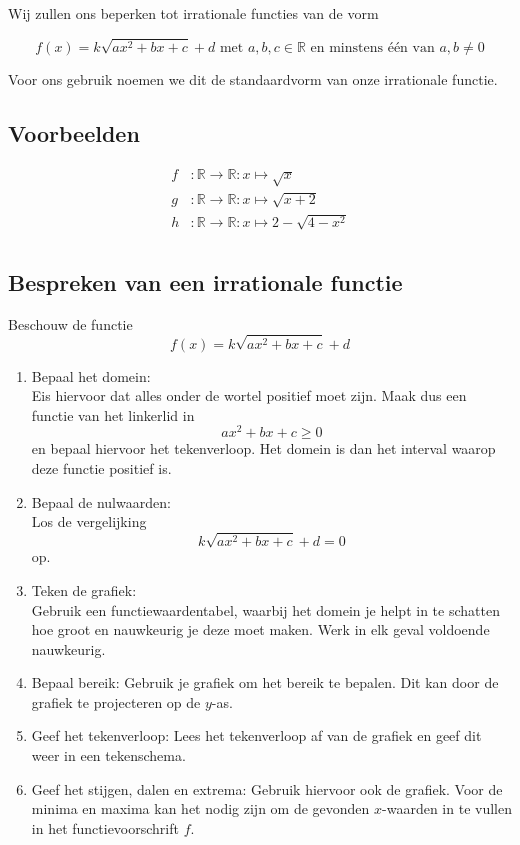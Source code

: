 \documentclass[12pt,twoside]{article}
\begin{document}
Wij zullen ons beperken tot irrationale functies van de vorm

$$f(x)=k\sqrt{ax^2+bx+c} + d \mbox{ met } a,b,c \in \mathbb{R} \mbox { en minstens één van } a,b \neq 0$$

Voor ons gebruik noemen we dit de standaardvorm van onze irrationale functie.

\subsection{Voorbeelden}

\begin{align*}
 f &: \mathbb{R} \to \mathbb{R} : x \mapsto \sqrt{x}\\
 g &: \mathbb{R} \to \mathbb{R} : x \mapsto \sqrt{x+2}\\
 h &: \mathbb{R} \to \mathbb{R} : x \mapsto 2 - \sqrt{4-x^2}\\
\end{align*}

\subsection{Bespreken van een irrationale functie}

Beschouw de functie
$$f(x)=k\sqrt{ax^2+bx+c} + d$$

\begin{enumerate}
\item Bepaal het domein:\\
  Eis hiervoor dat alles onder de wortel positief moet zijn. Maak dus een functie van het linkerlid in
  $$ ax^2 + bx + c \geq 0$$
  en bepaal hiervoor het tekenverloop. Het domein is dan het interval waarop deze functie positief is.
\item Bepaal de nulwaarden:\\
  Los de vergelijking
  $$ k\sqrt{ax^2+bx+c} + d = 0$$
  op.
\item Teken de grafiek:\\
  Gebruik een functiewaardentabel, waarbij het domein je helpt in te schatten hoe groot en nauwkeurig je deze moet maken. Werk in elk geval voldoende nauwkeurig.
\item Bepaal bereik:
  Gebruik je grafiek om het bereik te bepalen. Dit kan door de grafiek te projecteren op de $y$-as.
\item Geef het tekenverloop:
  Lees het tekenverloop af van de grafiek en geef dit weer in een tekenschema.
\item Geef het stijgen, dalen en extrema:
  Gebruik hiervoor ook de grafiek. Voor de minima en maxima kan het nodig zijn om de gevonden $x$-waarden in te vullen in het functievoorschrift $f$.
\end{enumerate}
\end{document}
